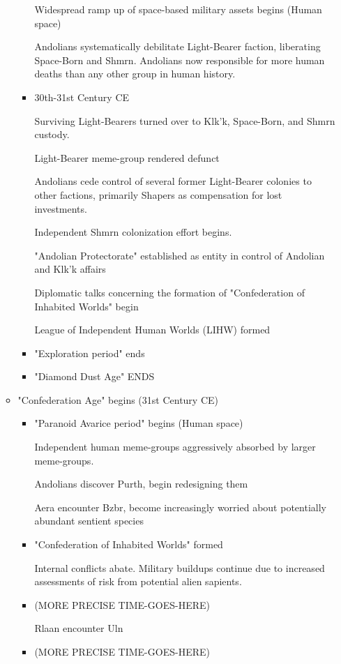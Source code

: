 \begin{itemize}
\begin{itemize}
\begin{itemize}
Widespread ramp up of space-based military assets begins (Human space)

Andolians systematically debilitate Light-Bearer faction, liberating
Space-Born and Shmrn. Andolians now responsible for more human deaths
than any other group in human history.

\item	30th-31st Century CE 

Surviving Light-Bearers turned over to Klk'k, Space-Born, and Shmrn
custody.

Light-Bearer meme-group rendered defunct 

Andolians cede control of several former Light-Bearer colonies to
other factions, primarily Shapers as compensation for lost
investments.

Independent Shmrn colonization effort begins. 

"Andolian Protectorate" established as entity in control of Andolian
and Klk'k affairs

Diplomatic talks concerning the formation of "Confederation of
Inhabited Worlds" begin

League of Independent Human Worlds (LIHW) formed

\item "Exploration period" ends 
\item "Diamond Dust Age" ENDS 
\end{itemize}
\item "Confederation Age" begins (31st Century CE)
\begin{itemize}
\item	"Paranoid Avarice period" begins (Human space) 

Independent human meme-groups aggressively absorbed by larger
meme-groups.

Andolians discover Purth, begin redesigning them

Aera encounter Bzbr, become increasingly worried about potentially
abundant sentient species

\item	"Confederation of Inhabited Worlds" formed 

Internal conflicts abate. Military buildups continue due to increased
assessments of risk from potential alien sapients.

\item	(MORE PRECISE TIME-GOES-HERE) 

Rlaan encounter Uln 
\item	(MORE PRECISE TIME-GOES-HERE) 


\end{itemize}
\end{itemize}
\end{itemize}
